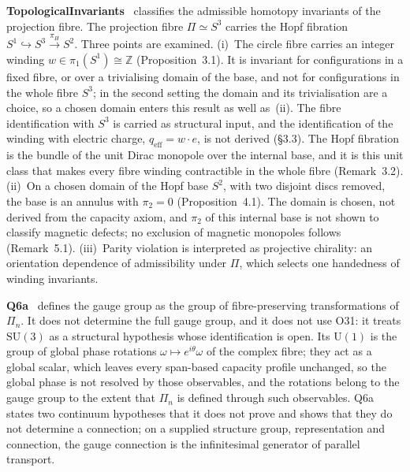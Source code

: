 \documentclass[11pt,a4paper]{article}
\theoremstyle{definition}
\newcommand{\SU}{\mathrm{SU}}
\newcommand{\UU}{\mathrm{U}}
\begin{document}
      \textbf{TopologicalInvariants}~\cite{Beau2026k} classifies the admissible homotopy
      invariants of the projection fibre.
      The projection fibre $\Pi \simeq S^3$ carries the Hopf fibration
      $S^1 \hookrightarrow S^3 \xrightarrow{\pi_H} S^2$.
      Three points are examined.
      (i)~The circle fibre carries an integer winding $w \in \pi_1(S^1) \cong \mathbb{Z}$
      (Proposition~3.1).
      It is invariant for configurations in a fixed fibre, or over a trivialising domain of the
      base, and not for configurations in the whole fibre $S^3$; in the second setting the domain
      and its trivialisation are a choice, so a chosen domain enters this result as well as~(ii).
      The fibre identification with $S^3$ is carried as structural input, and the identification of
      the winding with electric charge, $q_{\mathrm{eff}} = w \cdot e$, is not derived (§3.3).
      The Hopf fibration is the bundle of the unit Dirac monopole over the internal base, and it is
      this unit class that makes every fibre winding contractible in the whole fibre (Remark~3.2).
      (ii)~On a chosen domain of the Hopf base $S^2$, with two disjoint discs removed, the base is
      an annulus with $\pi_2 = 0$ (Proposition~4.1).
      The domain is chosen, not derived from the capacity axiom, and $\pi_2$ of this internal base
      is not shown to classify magnetic defects; no exclusion of magnetic monopoles follows
      (Remark~5.1).
      (iii)~Parity violation is interpreted as projective chirality: an orientation dependence of
      admissibility under $\Pi$, which selects one handedness of winding invariants.

      \textbf{Q6a}~\cite{Beau2026q6a} defines the gauge group as the group of fibre-preserving
      transformations of $\Pi_n$.
      It does not determine the full gauge group, and it does not use O31: it treats $\SU(3)$ as
      a structural hypothesis whose identification is open.
      Its $\UU(1)$ is the group of global phase rotations $\omega \mapsto e^{i\theta}\omega$ of the
      complex fibre; they act as a global scalar, which leaves every span-based capacity profile
      unchanged, so the global phase is not resolved by those observables, and the rotations belong to
      the gauge group to the extent that $\Pi_n$ is defined through such observables.
      Q6a states two continuum hypotheses that it does not prove and shows that they do not determine
      a connection; on a supplied structure group, representation and connection, the gauge connection
      is the infinitesimal generator of parallel transport.
\end{document}
